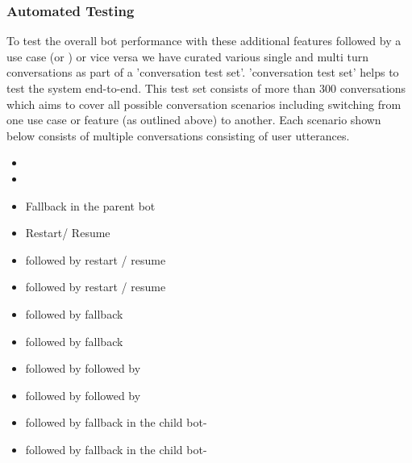 \documentclass[runningheads]{llncs}
\begin{document}
\subsubsection{Automated Testing}
To test the overall bot performance with these additional features followed by a use case (\ff or \faq) or vice versa we have curated various single and multi turn conversations as part of a 'conversation test set'. 'conversation test set' helps to test the system end-to-end. This test set consists of more than $300$ conversations which aims to cover all possible conversation scenarios including switching from one use case or feature (as outlined above) to another. Each scenario shown below consists of multiple conversations consisting of user utterances.
\begin{itemize}
    \item \ff
    \item \faq
    \item Fallback in the parent bot
    \item Restart/ Resume
    \item \ff followed by restart / resume
    \item \faq followed by restart / resume
    \item \ff followed by fallback
    \item \faq followed by fallback
    \item \faq followed by \ff followed by \faq
    \item \ff followed by \faq followed by \ff
    \item \faq followed by fallback in the child bot-\faq
    \item \ff followed by fallback in the child bot-\ff
\end{itemize}
\end{document}
